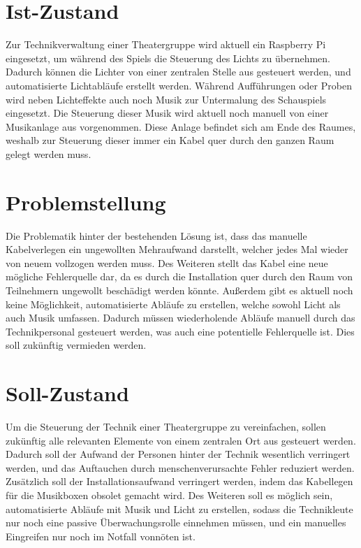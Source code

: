 

\section{Ist-Zustand}
Zur Technikverwaltung einer Theatergruppe wird aktuell ein Raspberry
Pi eingesetzt, um während des Spiels die Steuerung des Lichts zu übernehmen. Dadurch
können die Lichter von einer zentralen Stelle aus gesteuert werden,
und automatisierte Lichtabläufe erstellt werden. Während Aufführungen oder
Proben wird neben Lichteffekte auch noch Musik zur Untermalung des
Schauspiels eingesetzt. Die Steuerung dieser Musik wird aktuell noch manuell von
einer Musikanlage aus vorgenommen. Diese Anlage befindet sich am Ende des
Raumes, weshalb zur Steuerung dieser immer ein Kabel quer durch den ganzen
Raum gelegt werden muss.

\section{Problemstellung}
Die Problematik hinter der bestehenden Lösung ist, dass das manuelle Kabelverlegen
ein ungewollten Mehraufwand darstellt, welcher jedes Mal wieder von neuem
vollzogen werden muss. Des Weiteren stellt das Kabel eine neue mögliche
Fehlerquelle dar, da es durch die Installation quer durch den Raum von
Teilnehmern ungewollt beschädigt werden könnte.
Außerdem gibt es aktuell noch keine Möglichkeit, automatisierte
Abläufe zu erstellen, welche sowohl Licht als auch Musik umfassen. Dadurch
müssen wiederholende Abläufe manuell durch das Technikpersonal gesteuert
werden, was auch eine potentielle Fehlerquelle ist. Dies soll zukünftig
vermieden werden.


\section{Soll-Zustand}
Um die Steuerung der Technik einer Theatergruppe zu vereinfachen, sollen
zukünftig alle relevanten Elemente von einem zentralen Ort aus gesteuert
werden. Dadurch soll der Aufwand der Personen hinter der Technik wesentlich
verringert werden, und das Auftauchen durch menschenverursachte Fehler
reduziert werden. Zusätzlich soll der Installationsaufwand verringert werden,
indem das Kabellegen für die Musikboxen obsolet gemacht wird.  Des Weiteren
soll es möglich sein, automatisierte Abläufe mit Musik und Licht zu erstellen,
sodass die Technikleute nur noch eine passive Überwachungsrolle einnehmen
müssen, und ein manuelles Eingreifen nur noch im Notfall vonnöten ist. 


